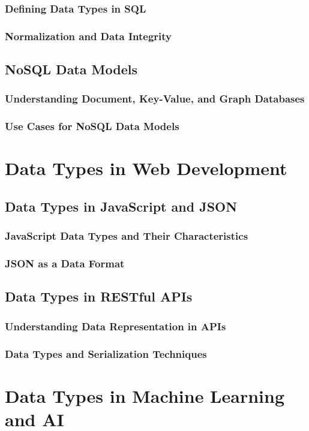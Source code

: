 \documentclass[12pt, oneside]{book}
\begin{document}
\subsubsection{Defining Data Types in SQL}
\subsubsection{Normalization and Data Integrity}
\subsection{NoSQL Data Models}
\subsubsection{Understanding Document, Key-Value, and Graph Databases}
\subsubsection{Use Cases for NoSQL Data Models}
\section{Data Types in Web Development}
\subsection{Data Types in JavaScript and JSON}
\subsubsection{JavaScript Data Types and Their Characteristics}
\subsubsection{JSON as a Data Format}
\subsection{Data Types in RESTful APIs}
\subsubsection{Understanding Data Representation in APIs}
\subsubsection{Data Types and Serialization Techniques}
\section{Data Types in Machine Learning and AI}
\end{document}
